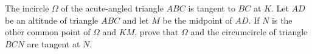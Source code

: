 The incircle $\Omega$ of the acute-angled triangle $ABC$ is tangent to $BC$ at $K$. Let $AD$ be an altitude of triangle $ABC$ and let $M$ be the midpoint of $AD$. If $N$ is the other common point of $\Omega$ and $KM$, prove that $\Omega$ and the circumcircle of triangle $BCN$ are tangent at $N$.
